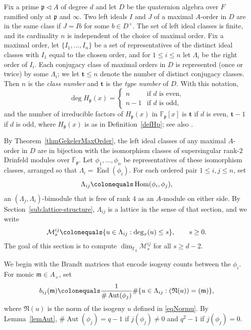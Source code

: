 \documentclass[12pt]{amsart}
\theoremstyle{definition}
\theoremstyle{remark}
\numberwithin{equation}{section}
\numberwithin{thm}{section}
\DeclareMathOperator{\Hom}{Hom}
\DeclareMathOperator{\End}{End}
\DeclareMathOperator{\Aut}{Aut}
\newcommand{\fN}{\mathfrak{N}}
\newcommand{\fm}{\mathfrak{m}}
\newcommand{\fp}{\mathfrak{p}}
\newcommand{\cM}{\mathcal{M}}
\newcommand{\F}{\mathbb{F}}
\newcommand{\oF}{\overline{\F}}
\newcommand{\La}{\Lambda}
\begin{document}
	Fix a prime $\fp\lhd A$ of degree $d$ and let $D$ be the quaternion algebra over $F$ ramified only at $\fp$ and $\infty$. Two left ideals $I$ and $J$ of a maximal $A$-order in $D$ are in the same class if $J=Ib$ for some $b\in D^\times$. The set of left ideal classes is finite, and its cardinality $n$ is independent of the choice of maximal order. Fix a maximal order, let $\{I_1, \dots, I_n\}$ be a set of representatives of the distinct ideal classes with $I_1$ equal to the chosen order, and for $1\leq i\leq n$ let $\La_i$ be the right order of $I_i$. Each conjugacy class of maximal orders in $D$ is represented (once or twice) by some $\La_i$; we let $\mathbf{t}\leq n$ denote the number of distinct conjugacy classes. Then $n$ is the \textit{class number} and $\mathbf{t}$ is the \textit{type number} of $D$. With this notation,
	\[
	\deg H_\fp(x) = \begin{cases} n & \text{if $d$ is even,} \\ n-1 & \text{if $d$ is odd,} \end{cases}
	\]
	and the number of irreducible factors of $H_\fp(x)$ in $\F_\fp[x]$ is $\mathbf{t}$ if $d$ is even, $\mathbf{t}-1$ if $d$ is odd, where $H_\fp(x)$ is as in Definition~\ref{defHp}; see also \cite[Prop. 4.6]{Gekeler91}.
	
	By Theorem~\ref{thmGekelerMaxOrder}, the left ideal classes of any maximal $A$-order in $D$ are in bijection with the isomorphism classes of supersingular rank-$2$ Drinfeld modules over $\oF_\fp$. Let $\phi_1, \dots, \phi_n$ be representatives of these isomorphism classes, arranged so that $\La_i = \End(\phi_i)$. For each ordered pair $1\leq i, j\leq n$, set
	\[
	\La_{ij} \colonequals \Hom(\phi_i, \phi_j),
	\]
	an $(\La_j, \La_i)$-bimodule that is free of rank $4$ as an $A$-module on either side. By Section~\ref{sub:lattice-structure}, $\La_{ij}$ is a lattice in the sense of that section, and we write
	\[
	\cM_s^{ij} \colonequals \{u\in \La_{ij} : \deg_\tau(u)\leq s\}, \qquad s\geq 0.
	\]
	The goal of this section is to compute $\dim_{\F_q}\cM_s^{ij}$ for all $s\geq d-2$.
	
	We begin with the Brandt matrices that encode isogeny counts between the $\phi_i$. For monic $\fm\in A_+$, set
	\begin{equation}\label{eqb1}
		b_{ij}(\fm) \colonequals \frac{1}{\#\Aut(\phi_j)} \#\{u\in \La_{ij} : (\fN(u))=(\fm)\},
	\end{equation}
	where $\fN(u)$ is the norm of the isogeny $u$ defined in \eqref{eqNormu}. By Lemma~\ref{lemAut}, $\#\Aut(\phi_j) = q-1$ if $j(\phi_j)\neq 0$ and $q^2-1$ if $j(\phi_j)=0$.
	
\end{document}
